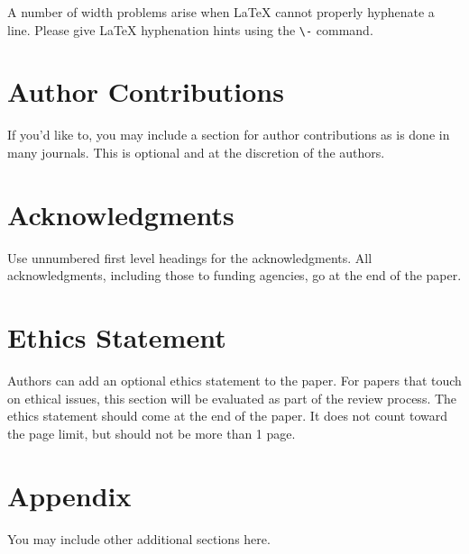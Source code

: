 \documentclass{article} %
\begin{document}
A number of width problems arise when LaTeX cannot properly hyphenate a
line. Please give LaTeX hyphenation hints using the \verb+\-+ command.

\section*{Author Contributions}
If you'd like to, you may include  a section for author contributions as is done
in many journals. This is optional and at the discretion of the authors.

\section*{Acknowledgments}
Use unnumbered first level headings for the acknowledgments. All
acknowledgments, including those to funding agencies, go at the end of the paper.

\section*{Ethics Statement}
Authors can add an optional ethics statement to the paper. 
For papers that touch on ethical issues, this section will be evaluated as part of the review process. The ethics statement should come at the end of the paper. It does not count toward the page limit, but should not be more than 1 page. 






\appendix
\section{Appendix}
You may include other additional sections here.
\end{document}
